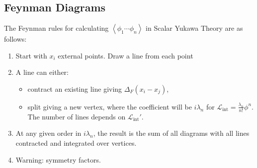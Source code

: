 \subsection{Feynman Diagrams}

The Feynman rules for calculating $\left<\phi_1 \cdots \phi_n \right>$ in Scalar Yukawa Theory are as follows:
\begin{enumerate}[label=\arabic*)]
    \item Start with $x_{i}$ external points. Draw a line from each point%
    \item A line can either:
        \begin{itemize}
            \item contract an existing line giving $\Delta_F \left( x_i - x_j \right)$,
            \item split giving a new vertex, where the coefficient will be $i \lambda_n$ for $\mathcal{L}_\text{int}= \frac{\lambda_{n}}{n!} \phi^{n}$. The number of lines depends on $\mathcal{L}_\text{int}'$.
        \end{itemize}
    \item At any given order in $i \lambda_n$, the result is the sum of all diagrams with all lines contracted and integrated over vertices.
    \item Warning: symmetry factors.
\end{enumerate}
